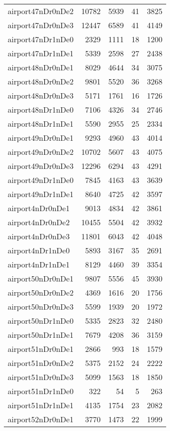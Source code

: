 \documentclass[../../../thesis.tex]{subfiles}
\begin{document}
\begin{longtable}{lrrrr}
airport47nDr0nDe2 & 10782 & 5939 & 41 & 3825 \\
airport47nDr0nDe3 & 12447 & 6589 & 41 & 4149 \\
airport47nDr1nDe0 & 2329 & 1111 & 18 & 1200 \\
airport47nDr1nDe1 & 5339 & 2598 & 27 & 2438 \\
airport48nDr0nDe1 & 8029 & 4644 & 34 & 3075 \\
airport48nDr0nDe2 & 9801 & 5520 & 36 & 3268 \\
airport48nDr0nDe3 & 5171 & 1761 & 16 & 1726 \\
airport48nDr1nDe0 & 7106 & 4326 & 34 & 2746 \\
airport48nDr1nDe1 & 5590 & 2955 & 25 & 2334 \\
airport49nDr0nDe1 & 9293 & 4960 & 43 & 4014 \\
airport49nDr0nDe2 & 10702 & 5607 & 43 & 4075 \\
airport49nDr0nDe3 & 12296 & 6294 & 43 & 4291 \\
airport49nDr1nDe0 & 7845 & 4163 & 43 & 3639 \\
airport49nDr1nDe1 & 8640 & 4725 & 42 & 3597 \\
airport4nDr0nDe1 & 9013 & 4834 & 42 & 3861 \\
airport4nDr0nDe2 & 10455 & 5504 & 42 & 3932 \\
airport4nDr0nDe3 & 11801 & 6043 & 42 & 4048 \\
airport4nDr1nDe0 & 5893 & 3167 & 35 & 2691 \\
airport4nDr1nDe1 & 8129 & 4460 & 39 & 3354 \\
airport50nDr0nDe1 & 9807 & 5556 & 45 & 3930 \\
airport50nDr0nDe2 & 4369 & 1616 & 20 & 1756 \\
airport50nDr0nDe3 & 5599 & 1939 & 20 & 1972 \\
airport50nDr1nDe0 & 5335 & 2823 & 32 & 2480 \\
airport50nDr1nDe1 & 7679 & 4208 & 36 & 3159 \\
airport51nDr0nDe1 & 2866 & 993 & 18 & 1579 \\
airport51nDr0nDe2 & 5375 & 2152 & 24 & 2222 \\
airport51nDr0nDe3 & 5099 & 1563 & 18 & 1850 \\
airport51nDr1nDe0 & 322 & 54 & 5 & 263 \\
airport51nDr1nDe1 & 4135 & 1754 & 23 & 2082 \\
airport52nDr0nDe1 & 3770 & 1473 & 22 & 1999 \\

\end{longtable}
\end{document}

